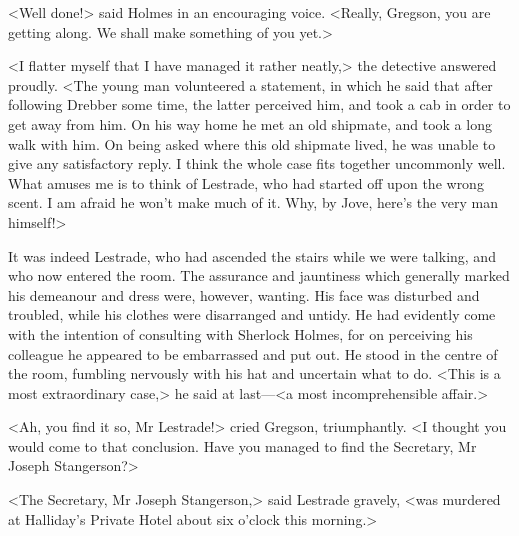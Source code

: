 <Well done!> said Holmes in an encouraging voice. <Really, Gregson, you are getting along. We shall make something of you yet.>

<I flatter myself that I have managed it rather neatly,> the detective answered proudly. <The young man volunteered a statement, in which he said that after following Drebber some time, the latter perceived him, and took a cab in order to get away from him. On his way home he met an old shipmate, and took a long walk with him. On being asked where this old shipmate lived, he was unable to give any satisfactory reply. I think the whole case fits together uncommonly well. What amuses me is to think of Lestrade, who had started off upon the wrong scent. I am afraid he won't make much of it. Why, by Jove, here's the very man himself!>

It was indeed Lestrade, who had ascended the stairs while we were talking, and who now entered the room. The assurance and jauntiness which generally marked his demeanour and dress were, however, wanting. His face was disturbed and troubled, while his clothes were disarranged and untidy. He had evidently come with the intention of consulting with Sherlock Holmes, for on perceiving his colleague he appeared to be embarrassed and put out. He stood in the centre of the room, fumbling nervously with his hat and uncertain what to do. <This is a most extraordinary case,> he said at last—<a most incomprehensible affair.>

<Ah, you find it so, Mr Lestrade!> cried Gregson, triumphantly. <I thought you would come to that conclusion. Have you managed to find the Secretary, Mr Joseph Stangerson?>

<The Secretary, Mr Joseph Stangerson,> said Lestrade gravely, <was murdered at Halliday's Private Hotel about six o'clock this morning.>